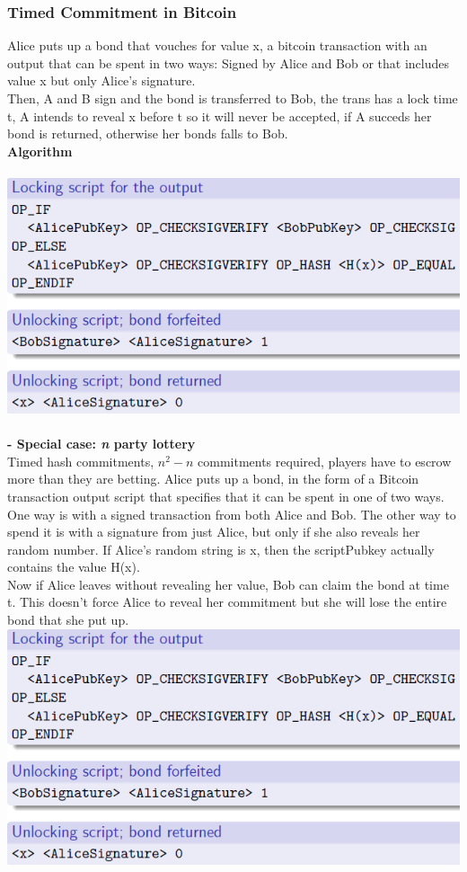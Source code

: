 \documentclass{article}
\begin{document}
\subsubsection{Timed Commitment in Bitcoin}
Alice puts up a bond that vouches for value x, a bitcoin transaction with an output that can be spent in two ways: Signed by Alice and Bob or that includes value x but only Alice's signature.\\
Then, A and B sign and the bond is transferred to Bob, the trans has a lock time t, A intends to reveal x before t so it will never be accepted, if A succeds her bond is returned, otherwise her bonds falls to Bob.\\
\textbf{Algorithm}\\\\
\includegraphics[scale=0.7]{50.png}\\\\
\textbf{- Special case: \textit{n} party lottery}\\
Timed hash commitments, $n^2 - n$ commitments required, players have to escrow more than they are betting. Alice puts up a bond, in the form of a Bitcoin transaction output script that specifies that it can be spent in one of two ways. One way is with a signed transaction from both Alice and Bob. The other way to spend it is with a signature from just Alice, but only if she also reveals her random number. If Alice’s random string is x, then the scriptPubkey actually contains the value H(x).\\
Now if Alice leaves without revealing her value, Bob can claim the bond at time t. This doesn't force Alice to reveal her commitment but she will lose the entire bond that she put up.\\
\includegraphics[scale=0.7]{50.png}
\newpage
\end{document}
